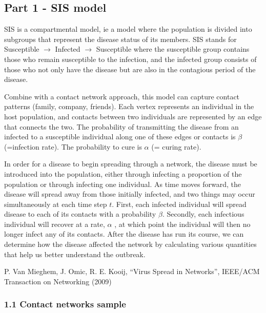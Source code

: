 \documentclass[11pt]{article}
\begin{document}
    \subsection{Part 1 - SIS model}\label{part-1---sis-model}

SIS is a compartmental model, ie a model where the population is divided
into subgroups that represent the disease status of its members. SIS
stands for Susceptible \(\rightarrow\) Infected \(\rightarrow\)
Susceptible where the susceptible group contains those who remain
susceptible to the infection, and the infected group consists of those
who not only have the disease but are also in the contagious period of
the disease.

Combine with a contact network approach, this model can capture contact
patterns (family, company, friends). Each vertex represents an
individual in the host population, and contacts between two individuals
are represented by an edge that connects the two. The probability of
transmitting the disease from an infected to a susceptible individual
along one of these edges or contacts is \(\beta\) (=infection rate). The
probability to cure is \(\alpha\) (= curing rate).

In order for a disease to begin spreading through a network, the disease
must be introduced into the population, either through infecting a
proportion of the population or through infecting one individual. As
time moves forward, the disease will spread away from those initially
infected, and two things may occur simultaneously at each time step
\(t\). First, each infected individual will spread disease to each of
its contacts with a probability \(\beta\). Secondly, each infectious
individual will recover at a rate, \(\alpha\) , at which point the
individual will then no longer infect any of its contacts. After the
disease has run its course, we can determine how the disease affected
the network by calculating various quantities that help us better
understand the outbreak.

P. Van Mieghem, J. Omic, R. E. Kooij, ``Virus Spread in Networks'',
IEEE/ACM Transaction on Networking (2009)

    \subsubsection{1.1 Contact networks
sample}\label{contact-networks-sample}
\end{document}
